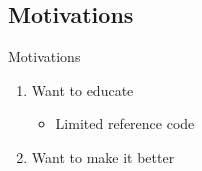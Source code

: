 \documentclass[10pt]{beamer}
\begin{document}
\subsection{Motivations}
\begin{frame}{Motivations}
  \begin{enumerate}
    \item Want to educate
      \begin{itemize}
        \item Limited reference code
      \end{itemize}
    \item Want to make it better
  \end{enumerate}
\end{frame}
\end{document}
